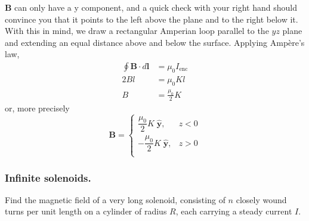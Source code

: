 \documentclass[../../../main.tex]{subfiles}
\begin{document}
\textbf{B} can only have a y component, and a quick check with your right hand should convince you that it points to the left above the plane and to the right below it. With this in mind, we draw a rectangular Amperian loop parallel to the $yz$ plane and extending an equal distance above and below the 
surface. Applying Ampère’s law,
\begin{align*}
    \oint \mathbf{B}\cdot d\mathbf{l}&=\mu_0I_{\text{enc}}\\
    2Bl&=\mu_0Kl\\
    B&=\frac{\mu_0}{2}K
\end{align*}
or, more precisely
\begin{equation*}
    \mathbf{B}=
    \begin{cases}
        \dfrac{\mu_0}{2}K\;\mathbf{\hat{y}},&z<0\\
        -\dfrac{\mu_0}{2}K\;\mathbf{\hat{y}},&z>0\\
    \end{cases}
\end{equation*}

\subsubsection{Inﬁnite solenoids.} Find the magnetic ﬁeld of a very long solenoid, consisting of $n$ closely wound turns per unit length on a cylinder of radius $R$, each carrying a steady current $I$.

\begin{figure}[ht]
    \centering
\end{figure}
\end{document}
